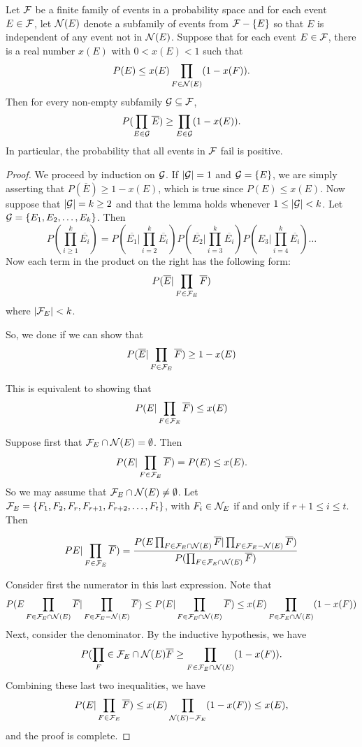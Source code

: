\begin{lemma}\label{lem:LLL}
Let $\mathcal{F}$ be a finite family of events in a probability space 
and for each event $E\in\mathcal{F}$, let $\mathcal{N}(E)$ denote a
subfamily of events from $\mathcal{F}-\{E\}$ so that $E$ is independent of 
any event not in $\mathcal{N}(E)$.  Suppose that
for each event $E\in\mathcal{F}$, there is a real number $x(E)$ with
$0<x(E)<1$ such that
\[
P(E)\le x(E)\prod_{F\in\mathcal{N}(E)}(1-x(F)).
\]
Then for every non-empty subfamily $\mathcal{G}\subseteq\mathcal{F}$,
\[
P(\prod_{E\in\mathcal{G}}\overline{E})\ge\prod_{E\in\mathcal{G}}(1-x(E)).
\]
In particular, the probability that all events in $\mathcal{F}$ 
fail is positive.
\end{lemma}
\begin{proof}
We proceed by induction on $\mathcal{G}$. If $|\mathcal{G}|=1$ and $\mathcal{G}=\{E\}$,
we are simply asserting that $P(\overline{E})\ge 1-x(E)$, which is true
since $P(E)\le x(E)$.  Now suppose that $|\mathcal{G}|=k\ge2$ and that the lemma
holds whenever $1\le |\mathcal{G}|<k$.  Let $\mathcal{G} =\{E_1,E_2,\dots,E_k\}$.
Then
\[
P(\prod_{i\ge1}^k \overline{E_i})=P(\overline{E_1}|\prod_{i=2}^k\overline{E_i})
  P(\overline{E_2}|\prod_{i=3}^k\overline{E_i})P(E_3|\prod_{i=4}^k\overline{E_i})\dots
\]
Now each term in the product on the right has the following
form:
\[
P(\overline{E}|\prod_{F\in\mathcal{F}_E}\overline{F})
\]
where $|\mathcal{F}_E|<k$.

So, we done if we can show that
\[
P(\overline{E}|\prod_{F\in\mathcal{F}_E}\overline{F})\ge 1- x(E)
\]

This is equivalent to showing that
\[
P(E|\prod_{F\in\mathcal{F}_E}\overline{F})\le x(E)
\]

Suppose first that $\mathcal{F}_E\cap\mathcal{N}(E)=\emptyset$.  Then
\[
P(E|\prod_{F\in\mathcal{F}_E}\overline{F})=P(E)\le x(E).
\]
So we may assume that $\mathcal{F}_E\cap\mathcal{N}(E)\neq\emptyset$.  Let
$\mathcal{F}_E=\{F_1,F_2,F_r,F_{r+1},F_{r+2},\dots, F_t\}$, with
$F_i\in\mathcal{N}_E$ if and only if $r+1\le i\le t$.  Then

\[
PE|\prod_{F\in\mathcal{F}_E}\overline{F})=
 \frac{P(E\prod_{F\in\mathcal{F}_E\cap\mathcal{N}(E)}\overline{F}|\prod_{F\in\mathcal{F}_E-\mathcal{N}(E)}\overline{F})}
 {P(\prod_{F\in\mathcal{F}_E\cap \mathcal{N}(E)}\overline{F})}
\]

Consider first the numerator in this last expression.  Note that
\[
P(E\prod_{F\in\mathcal{F}_E\cap\mathcal{N}(E)}\overline{F}|\prod_{F\in\mathcal{F}_E-\mathcal{N}(E)}\overline{F})\le
P(E|\prod_{F\in\mathcal{F}_E\cap\mathcal{N}(E)}\overline{F})\le x(E)\prod_{F\in\mathcal{F}_E\cap\mathcal{N}(E)}(1-x(F))
\]
Next, consider the denominator.  By the inductive hypothesis, we have
\[
P(\prod_F\in\mathcal{F}_E\cap\mathcal{N}(E)\overline{F}\ge \prod_{F\in\mathcal{F}_E\cap\mathcal{N}(E)}(1-x(F)).
\] 
Combining these last two inequalities, we have
\[
P(E|\prod_{F\in\mathcal{F}_E}\overline{F})\le x(E)\prod_{\mathcal{N}(E)-\mathcal{F}_E}(1-x(F))\le x(E),
\]
and the proof is complete.
\end{proof}

